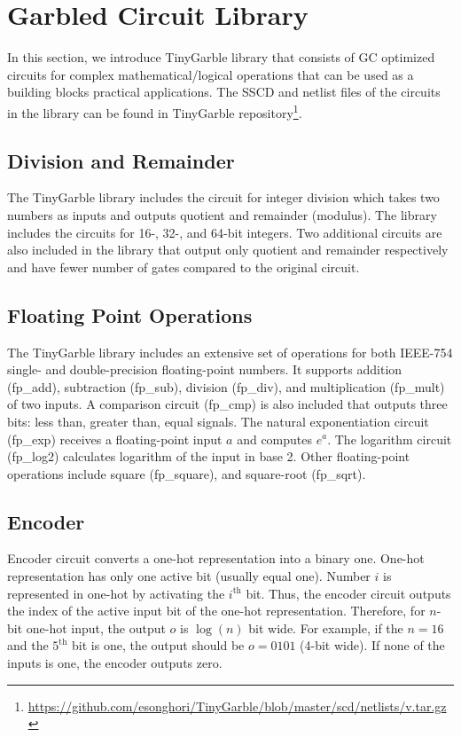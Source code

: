 \chapter{Garbled Circuit Library}\label{sec:library}
In this section, we introduce TinyGarble library that consists of GC optimized circuits for complex mathematical/logical operations that can be used as a building blocks practical applications.
The SSCD and netlist files of the circuits in the library can be found in TinyGarble repository\footnote{\url{https://github.com/esonghori/TinyGarble/blob/master/scd/netlists/v.tar.gz}}.


\section{Division and Remainder}
The TinyGarble library includes the circuit for integer division which takes two numbers as inputs and outputs quotient and remainder (modulus).
The library includes the circuits for 16-, 32-, and 64-bit integers.
Two additional circuits are also included in the library that output only quotient and remainder respectively and have fewer number of gates compared to the original circuit.

\section{Floating Point Operations}
The TinyGarble library includes an extensive set of operations for both IEEE-754 single- and double-precision floating-point numbers.
It supports addition (fp\_add), subtraction (fp\_sub), division (fp\_div), and multiplication (fp\_mult) of two inputs.
A comparison circuit (fp\_cmp) is also included that outputs three bits: less than, greater than, equal signals.
The natural exponentiation circuit (fp\_exp) receives a floating-point input $a$ and computes $e^a$.
The logarithm circuit (fp\_log2) calculates logarithm of the input in base 2.
Other floating-point operations include square (fp\_square), and square-root (fp\_sqrt).

\section{Encoder}
Encoder circuit converts a one-hot representation into a binary one.
One-hot representation has only one active bit (usually equal one).
Number $i$ is represented in one-hot by activating the $i^{\text{th}}$ bit.
Thus, the encoder circuit outputs the index of the active input bit of the one-hot representation.
Therefore, for $n$-bit one-hot input, the output $o$ is $\log(n)$ bit wide.
For example, if the $n=16$ and the $5^{\text{th}}$ bit is one, the output should be $o=0101$ (4-bit wide).
If none of the inputs is one, the encoder outputs zero.

